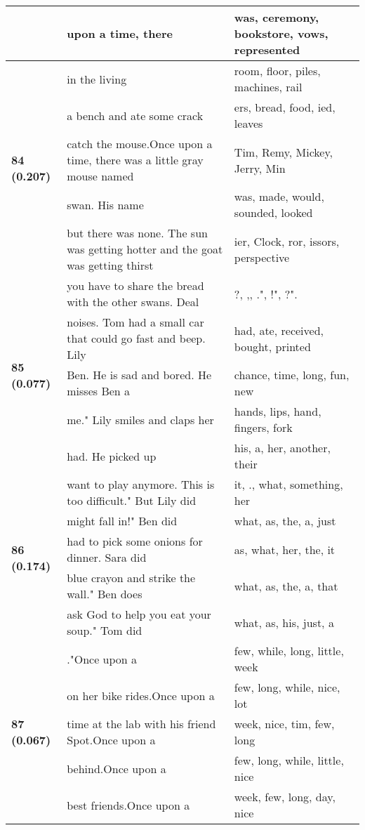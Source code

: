 \documentclass{article}
\begin{document}
\begin{adjustbox}{max width=\textwidth}
\begin{tabular}{p{} p{} p{}}
 & upon a time, there & was,  ceremony,  bookstore,  vows,  represented \\
\midrule
\multirow{5}{*}{\textbf{84 (0.207)}} & in the living & room,  floor,  piles,  machines,  rail \\
 & a bench and ate some crack & ers,  bread,  food, ied,  leaves \\
 & catch the mouse.Once upon a time, there was a little gray mouse named & Tim,  Remy,  Mickey,  Jerry,  Min \\
 & swan. His name & was,  made,  would,  sounded,  looked \\
 & but there was none. The sun was getting hotter and the goat was getting thirst & ier, Clock, ror, issors,  perspective \\
\midrule
\multirow{5}{*}{\textbf{85 (0.077)}} & you have to share the bread with the other swans. Deal & ?, ,, .", !", ?". \\
 & noises. Tom had a small car that could go fast and beep. Lily & had,  ate,  received,  bought,  printed \\
 & Ben. He is sad and bored. He misses Ben a & chance,  time,  long,  fun,  new \\
 & me."  Lily smiles and claps her & hands,  lips,  hand,  fingers,  fork \\
 & had. He picked up & his,  a,  her,  another,  their \\
\midrule
\multirow{5}{*}{\textbf{86 (0.174)}} & want to play anymore. This is too difficult." But Lily did & it, .,  what,  something,  her \\
 & might fall in!"  Ben did & what,  as,  the,  a,  just \\
 & had to pick some onions for dinner. Sara did & as,  what,  her,  the,  it \\
 & blue crayon and strike the wall."  Ben does & what,  as,  the,  a,  that \\
 & ask God to help you eat your soup."  Tom did & what,  as,  his,  just,  a \\
\midrule
\multirow{5}{*}{\textbf{87 (0.067)}} & ."Once upon a & few,  while,  long,  little,  week \\
 & on her bike rides.Once upon a & few,  long,  while,  nice,  lot \\
 & time at the lab with his friend Spot.Once upon a & week,  nice,  tim,  few,  long \\
 & behind.Once upon a & few,  long,  while,  little,  nice \\
 & best friends.Once upon a & week,  few,  long,  day,  nice \\

\end{tabular}
\end{adjustbox}
\end{document}
